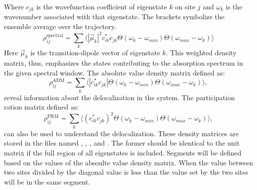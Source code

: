 Where $c_{jk}$ is the wavefunction coefficient of eigenstate $k$ on site $j$ and $\omega_k$ is the wavenumber associated with that eigenstate.
The brackets symbolize the ensemble average over the trajectory.
\begin{equation}
\rho^{\textrm{spectral}}_{ij}=\sum_k \Big\langle |\vec{\mu}_k|^2 c_{ik}^* c_{jk}  \Theta(\omega_{k}-\omega_{min})\Theta(\omega_{max}-\omega_k)\Big\rangle
\end{equation}
Here $\vec{\mu}_k$ is the transition-dipole vector of eigenstate $k$.
This weighted density matrix, thus, emphasizes the states contributing to the absorption spectrum in the given spectral window.
The absolute value density matrix defined as:
\begin{equation}
	\rho^{\textrm{ADM}}_{ij}=\sum_k \Big\langle |c_{ik}^* c_{jk}|  \Theta(\omega_{k}-\omega_{min})\Theta(\omega_{max}-\omega_k)\Big\rangle,
\end{equation}
reveal information about the delocalization in the system.
The participation ration matrix defined as:
\begin{equation}
	\rho^{\textrm{PRM}}_{ij}=\sum_k \Big\langle (c_{ik}^* c_{jk})^2  \Theta(\omega_{k}-\omega_{min})\Theta(\omega_{max}-\omega_k)\Big\rangle,
\end{equation}
can also be used to understand the delocalization.
These density matrices are stored in the files named , , , and .
The former should be identical to the unit matrix if the full region of all eigenstates is included.
Segments will be defined based on the values of the absoulte value density matrix.
When the value between two sites divided by the diagonal value is less than the value set by  the two sites will be in the same segment. 


